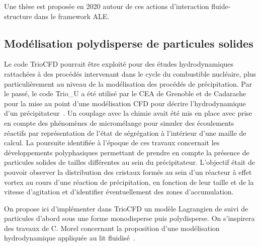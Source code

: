 \begin{rque}
Une th\`ese est propos\'ee en 2020 autour de ces actions d'interaction fluide-structure dans le framework ALE.  
\end{rque}


\subsection{Mod\'elisation polydisperse de particules solides}
\label{section-polydisperse}
Le code TrioCFD pourrait \^etre exploit\'e pour des \'etudes hydrodynamiques rattach\'ees \`a des proc\'ed\'es intervenant dans le cycle du combustible nucl\'eaire, plus
particuli\`erement au niveau de la mod\'elisation des proc\'ed\'es de pr\'ecipitation. Par le pass\'e, le code Trio\_U a \'et\'e  utilis\'e par le CEA de Grenoble et de
Cadarache pour la mise au point d'une mod\'elisation CFD pour d\'ecrire l'hydrodynamique d'un pr\'ecipitateur~\cite{HDR-MBertrand}. Un couplage avec la chimie avait \'et\'e
mis en place avec prise en compte des ph\'enom\`enes de microm\'elange pour simuler des \'ecoulements r\'eactifs par repr\'esentation de l'\'etat de s\'egr\'egation \`a
l'int\'erieur d'une maille de calcul.  La poursuite identifi\'ee \`a l'\'epoque de ces travaux concernait les d\'eveloppements polyphasiques permettant de prendre en compte
la pr\'esence de particules solides de tailles diff\'erentes au sein du pr\'ecipitateur.  L'objectif \'etait de pouvoir observer la distribution des cristaux form\'es au sein d'un r\'eacteur \`a effet vortex au cours d'une r\'eaction de pr\'ecipitation, en fonction de leur taille et de la vitesse d'agitation et d'identifier \'eventuellement des zones d'accumulation.

On propose ici d'impl\'ementer dans TrioCFD un mod\`ele Lagrangien de suivi de particules d'abord sous une forme monodisperse puis polydisperse. On s'inspirera des travaux de C. Morel concernant la proposition d'une mod\'elisation hydrodynamique appliqu\'ee au lit fluidis\'e~\cite{Morel}. 

